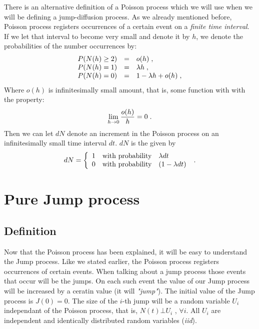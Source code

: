\documentclass[times, utf8, diplomski]{fer}
\begin{document}
		\noindent There is an alternative definition of a Poisson process which we will use when we will be defining a jump-diffusion process. As we already mentioned before, Poisson process registers occurrences of a certain event on a \textit{finite time interval}. If we let that interval to become very small and denote it by $h$, we denote the probabilities of the number occurrences by: 
		\begin{equation}
			\begin{array}{rcl}
				P(N(h) \geq 2) &\mbox{=}& o(h) \hspace{0.1cm}, \\
				P(N(h) = 1) &\mbox{=}& \lambda h \hspace{0.1cm}, \\
				P(N(h) = 0) &\mbox{=}& 1 - \lambda h + o(h) \hspace{0.1cm},
			\end{array}
		\end{equation}
		Where $o(h)$ is infinitesimally small amount, that is, some function with with the property: \begin{equation} \lim_{h \to 0} \frac{o(h)}{h} = 0 \hspace{0.1cm}. \end{equation} Then we can let $dN$ denote an increment in the Poisson process on an infinitesimally small time interval $dt$. $dN$ is the given by
		\begin{equation} 
			dN = \left\{  \begin{array}{lcl} 1 & \mbox{with probability} & \lambda dt \\
																	0 & \mbox{with probability} & (1 - \lambda dt) \end{array} \right.
		 \hspace{0.1cm}. \end{equation}
	
	\section{Pure Jump process}
		\subsection{Definition}
		Now that the Poisson process has been explained, it will be easy to understand the Jump process. Like we stated earlier, the Poisson process registers occurrences of certain events. When talking about a jump process those events that occur will be the jumps. On each such event the value of our Jump process will be increased by a ceratin value (it will \textit{"jump"}). The initial value of the Jump process is $J(0) = 0$. The size of the $i$-th jump will be a random variable $U_i$ independant of the Poisson process, that is, $N(t) \bot U_i$ , $\forall i$. All $U_i$ are independent and identically distributed random variables (\textit{iid}).
\end{document}
